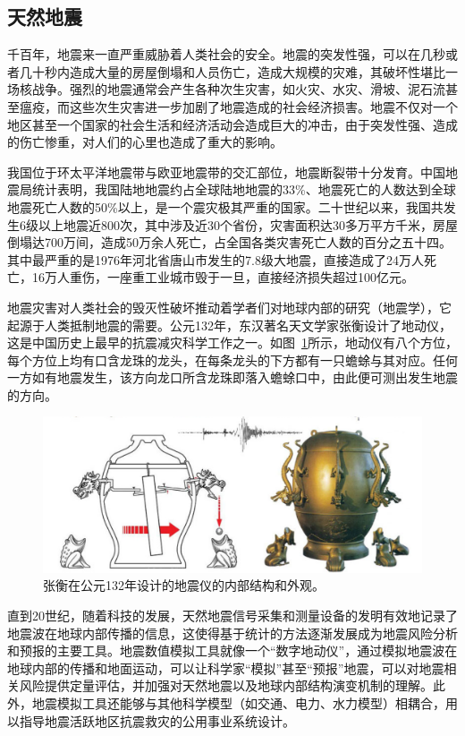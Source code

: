 \documentclass[degree=doctor]{thuthesis}
\begin{document}
\subsection{天然地震}

千百年，地震来一直严重威胁着人类社会的安全。地震的突发性强，可以在几秒或者几十秒内造成大量的房屋倒塌和人员伤亡，造成大规模的灾难，其破坏性堪比一场核战争。强烈的地震通常会产生各种次生灾害，如火灾、水灾、滑坡、泥石流甚至瘟疫，而这些次生灾害进一步加剧了地震造成的社会经济损害。地震不仅对一个地区甚至一个国家的社会生活和经济活动会造成巨大的冲击，由于突发性强、造成的伤亡惨重，对人们的心里也造成了重大的影响。

我国位于环太平洋地震带与欧亚地震带的交汇部位，地震断裂带十分发育。中国地震局统计表明，我国陆地地震约占全球陆地地震的33\%、地震死亡的人数达到全球地震死亡人数的50\%以上，是一个震灾极其严重的国家\cite{地震局}。二十世纪以来，我国共发生6级以上地震近800次，其中涉及近30个省份，灾害面积达30多万平方千米，房屋倒塌达700万间，造成50万余人死亡，占全国各类灾害死亡人数的百分之五十四。其中最严重的是1976年河北省唐山市发生的7.8级大地震，直接造成了24万人死亡，16万人重伤，一座重工业城市毁于一旦，直接经济损失超过100亿元\cite{地震局}。

地震灾害对人类社会的毁灭性破坏推动着学者们对地球内部的研究（地震学），它起源于人类抵制地震的需要。公元132年，东汉著名天文学家张衡设计了地动仪，这是中国历史上最早的抗震减灾科学工作之一\citep{stein2009introduction}。如图~\ref{fig:heng-scope}所示，地动仪有八个方位，每个方位上均有口含龙珠的龙头，在每条龙头的下方都有一只蟾蜍与其对应。任何一方如有地震发生，该方向龙口所含龙珠即落入蟾蜍口中，由此便可测出发生地震的方向\cite{seismoscopewiki}。

\begin{figure}[ht]
\centering
\includegraphics[width=0.7\columnwidth]{seismoscope.png}
\caption{张衡在公元132年设计的地震仪的内部结构和外观\citep{hsiao2009review}。}
\label{fig:heng-scope}
\end{figure}

直到20世纪，随着科技的发展，天然地震信号采集和测量设备的发明有效地记录了地震波在地球内部传播的信息，这使得基于统计的方法逐渐发展成为地震风险分析和预报的主要工具。地震数值模拟工具就像一个“数字地动仪”，通过模拟地震波在地球内部的传播和地面运动，可以让科学家“模拟”甚至“预报”地震，可以对地震相关风险提供定量评估，并加强对天然地震以及地球内部结构演变机制的理解。此外，地震模拟工具还能够与其他科学模型（如交通、电力、水力模型）相耦合，用以指导地震活跃地区抗震救灾的公用事业系统设计。
\end{document}
